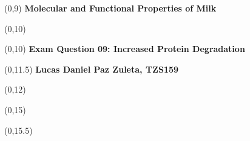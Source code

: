 \begin{titlepage}

    
    \begin{textblock}{9.4}(0,9)
        \Huge{\selectfont\bfseries{Molecular and Functional Properties of Milk}}
    \end{textblock}
    \begin{textblock}{9.4}(0,10)
        \Huge{\selectfont\bfseries{}}
    \end{textblock}
    
    \begin{textblock}{9.4}(0,10)
        \LARGE{\selectfont\bfseries{Exam Question 09: Increased Protein Degradation}}
    \end{textblock}
    
    \begin{textblock}{9.4}(0,11.5)
        \large{\selectfont\bfseries{
        Lucas Daniel Paz Zuleta, TZS159}}
    \end{textblock}
    
    \begin{textblock}{9.4}(0,12)
        \large{\selectfont{MSc student at the University of Copenhagen}}
    \end{textblock}
    
    \begin{textblock}{9.4}(0,15)
        \large{\selectfont{Last compiled: \today}}
    \end{textblock}
    
    \begin{textblock}{8.4}(0,15.5)
        \large{}
    \end{textblock}
    

\end{titlepage}
